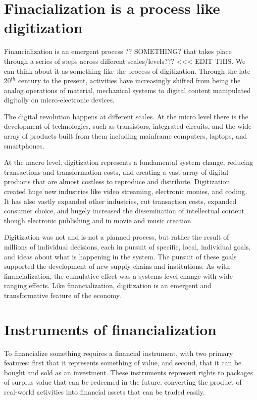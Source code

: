 \section{Finacialization is a process like digitization}
Financialization is an emergent process ?? SOMETHING?  that takes place through a series of steps across different scales/levels??? <<< EDIT THIS. We can think about it as something like the process of \gls{digitization}. 
Through the late 20$^{th}$ century to the present, activities have increasingly shifted from being the analog operations of material, mechanical systems  to digital content manipulated digitally on micro-electronic devices. 

The digital revolution happens at different scales. At the micro level there is the development of technologies, such as transistors, integrated circuits, and the wide array of products built from them including mainframe computers, laptops, and smartphones.  

At the macro level, digitization represents a fundamental system change, reducing transactions and transformation costs, and creating a vast array of digital products that are almost costless to reproduce and distribute. Digitization created huge new industries like video streaming, electronic monies, and coding. It has also vastly expanded other industries, %
cut transaction costs, expanded consumer choice, %
and hugely increased the dissemination of intellectual content though electronic publishing and in movie and music creation.   

Digitization was not and is not a planned process, but rather the result of millions of individual decisions, each in pursuit of specific, local, individual goals, and ideas about what is happening in the system. The pursuit of these goals supported the development of  new supply chains and institutions. As with financialization, the cumulative effect was a systems level change with wide ranging effects.  Like  financialization, digitization is an emergent and transformative feature of the economy.

\section{Instruments of financialization }
To financialize something requires a \gls{financial instrument}, with two primary features: first that it represents something of value, and second, that it can be bought and sold as an investment. These instruments represent rights to packages of surplus value that can be redeemed in the future, converting the product of real-world activities into financial assets that can be traded easily. 

